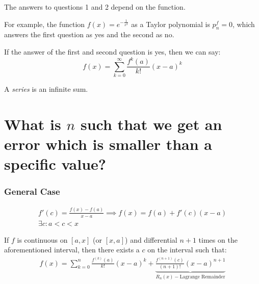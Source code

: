 \documentclass[00_complete]{subfiles}
\begin{document}
The answers to questions 1 and 2 depend on the function.

For example, the function $f(x)=e^{-\frac{1}{x^2}}$ as a Taylor polynomial is
$p^f_n=0$, which answers the first question as yes and the second as no.

If the answer of the first and second question is yes, then we can say:
$$\boxed{f(x)=\sum_{k=0}^{\infty} \frac{f^{k}(a)}{k!}(x-a)^k}$$

\begin{note}
    A \emph{series} is an infinite sum.
\end{note}

\section{What is \texorpdfstring{$n$}{n} such that we get an error which is
smaller than a specific value?}

\subsubsection{General Case}

\begin{reminder}
    $$
    \begin{gathered}
        f'(c) = \frac{f(x)-f(a)}{x-a} \implies f(x)=f(a)+ f'(c)(x-a) \\
        \exists c: a < c < x
    \end{gathered}
    $$
\end{reminder}
\begin{definition}
   If $f$ is continuous on $[a,x]$ (or $[x,a]$) and differential $n+1$ times
   on the aforementioned interval, then there exists a $c$ on the interval
   such that:
   $$
   \begin{gathered}
       f(x)= \sum_{k=0}^{n} \frac{f^{(k)}(a)}{k!}(x-a)^k +
       \underbrace{\frac{f^{(n+1)}(c)}{(n+1)!}(x-a)^{n+1}}_{R_n(x) -\text{Lagrange Remainder}}
   \end{gathered}
   $$
\end{definition}
\end{document}
